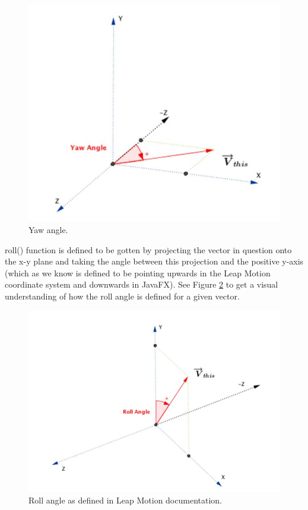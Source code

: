 \begin{figure}[H]
\begin{minipage}{0.5\textwidth}
        \includegraphics[scale=.55]{Figures/4_yawPic.JPG}
        \caption[Yaw]{Yaw angle.}
        \label{fig:yawPic}
    \end{minipage}
\end{figure}

roll() function is defined to be gotten by projecting the vector in question onto the x-y plane and taking the angle between this projection and the positive y-axis (which as we know is defined to be pointing upwards in the Leap Motion coordinate system and downwards in JavaFX). See Figure \ref{fig:rollPic} to get a visual understanding of how the roll angle is defined for a given vector.
\begin{figure}[H]
\centering
\includegraphics[scale=0.65]{Figures/4_rollPic.JPG}
\caption[Roll]{Roll angle as defined in Leap Motion documentation.}
\label{fig:rollPic}
\end{figure}



